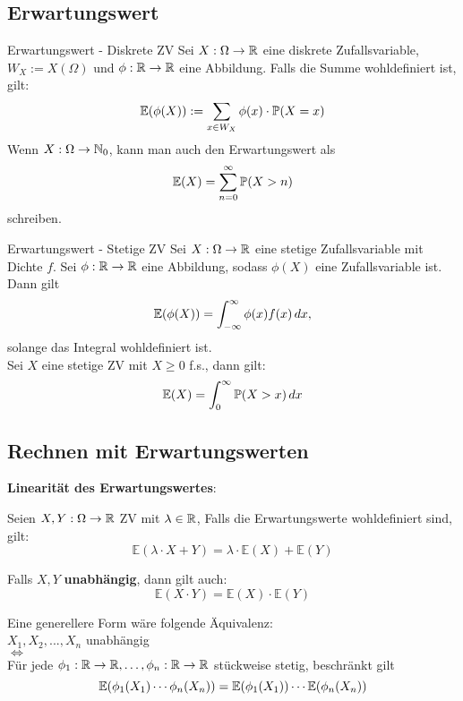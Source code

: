 \subsection{Erwartungswert}
\begin{mainbox}{Erwartungswert - Diskrete ZV}
    Sei $X: \Omega \to \R$ eine diskrete Zufallsvariable, $W_X := X(\Omega)$ und $\phi: \R \to \R$ eine Abbildung. Falls die Summe wohldefiniert ist, gilt: 
    $$\mathbb{E}(\phi(X)) := \sum_{x \in W_X} \phi(x) \cdot \P(X = x)$$
    Wenn $X: \Omega \to \N_0$, kann man auch den Erwartungswert als
    $$\mathbb{E}(X) = \sum_{n = 0}^{\infty}\P(X > n)$$
    schreiben.
\end{mainbox}
\begin{mainbox}{Erwartungswert - Stetige ZV}
    Sei $X: \Omega \to \R$ eine stetige Zufallsvariable mit Dichte $f$. Sei $\phi: \R \to \R$ eine Abbildung, sodass $\phi(X)$ eine Zufallsvariable ist. Dann gilt
    $$\mathbb{E}(\phi(X))= \int_{-\infty}^\infty \phi(x)f(x)\dx,$$
    solange das Integral wohldefiniert ist.
    \\Sei $X$ eine stetige ZV mit $X \geq 0$ f.s., dann gilt:
    $$\E(X)=\int_0^\infty \P(X > x)\dx$$ 
\end{mainbox}

\subsection{Rechnen mit Erwartungswerten}
\textbf{Linearität des Erwartungswertes}: 

Seien $X, Y: \Omega \to \R$ ZV mit $\lambda \in \R$, Falls die Erwartungswerte wohldefiniert sind, gilt:
$$\mathbb{E}(\lambda \cdot X + Y) = \lambda \cdot \mathbb{E}(X) + \mathbb{E}(Y)$$

Falls $X, Y$ \textbf{unabhängig}, dann gilt auch:
$$\mathbb{E}(X \cdot Y) = \mathbb{E}(X) \cdot \mathbb{E}(Y)$$

Eine generellere Form wäre folgende Äquivalenz:\\
$X_1, X_2, ...,X_n$ unabhängig
\\$\iff$
\\Für jede $\phi_1: \R \to \R, \ldots, \phi_n: \R \to \R$ stückweise stetig, beschränkt gilt
$$\E(\phi_1(X_1)\cdots\phi_n(X_n))=\E(\phi_1(X_1))\cdots\E(\phi_n(X_n))$$ 

